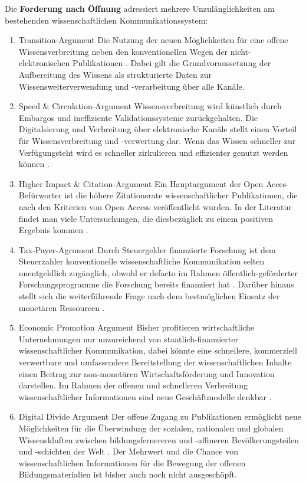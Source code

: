 Die \textbf{Forderung nach Öffnung} adressiert mehrere Unzulänglichkeiten am bestehenden wissenschaftlichen Kommunikationssystem:
\begin{enumerate}
\item Transition-Argument
Die Nutzung der neuen Möglichkeiten für eine offene Wissensverbreitung neben den konventionellen Wegen der nicht-elektronischen Publikationen . Dabei gilt die Grundvoraussetzung der Aufbereitung des Wissens als strukturierte Daten zur Wissensweiterverwendung und -verarbeitung über alle Kanäle.
\item Speed & Circulation-Argument
Wissensverbreitung wird künstlich durch Embargos und ineffiziente Validationssysteme zurückgehalten. Die Digitalsierung und Verbreitung über elektronische Kanäle stellt einen Vorteil für Wissensverbreitung und -verwertung dar. Wenn das Wissen schneller zur Verfügungsteht wird es schneller zirkulieren und effizienter genutzt werden können \cite{Woelfle_2011}.  
\item Higher Impact & Citation-Argument
Ein Hauptargument der Open Acces-Befürworter ist die höhere Zitationsrate wissenschaftlicher Publikationen, die nach den Kriterien von Open Access veröffentlicht wurden\cite{cite:21a}. In der Literatur findet man viele Untersuchungen, die diesbezüglich zu einem positiven Ergebnis kommen \cite{Lawrence_2001} \cite{Jeffrey_2008} \cite{Eysenbach_2006} \cite{Antelman_2004}.
\item Tax-Payer-Agrument
Durch Steuergelder finanzierte Forschung ist dem Steuerzahler konventionelle wissenschaftliche Kommunikation selten unentgeldlich zugänglich, obwohl er defacto im Rahmen öffentlich-geförderter Forschungsprogramme die Forschung bereits finanziert hat \cite{suchen}. Darüber hinaus stellt sich die weiterführende Frage nach dem bestmöglichen Einsatz der monetären Ressourcen \cite{Glasziou_2014} \cite{altman_1994_scandal}.
\item Economic Promotion Argument
Bisher profitieren wirtschaftliche Unternehmungen nur unzureichend von staatlich-finanzierter wissenschaftlicher Kommunikation, dabei könnte eine schnellere, kommerziell verwertbare und umfassendere Bereitstellung der wissenschaftlichen Inhalte einen Beitrag zur non-monetären Wirtschaftsförderung und Innovation darstellen. Im Rahmen der offenen und schnelleren Verbreitung wissenschaftlicher Informationen sind neue Geschäftmodelle denkbar \cite{suchen}.
\item Digital Divide Argument
Der offene Zugang zu Publikationen ermöglicht neue Möglichkeiten für die Überwindung der sozialen, nationalen und globalen Wissenskluften  zwischen bildungsfernereren und -affineren Bevölkerungsteilen und -schichten der Welt . Der Mehrwert und die Chance von wissenschaftlichen Informationen für die Bewegung der offenen Bildungsmaterialien ist bisher auch noch nicht ausgeschöpft\cite{heise_lernen_2013}.

\end{enumerate}
